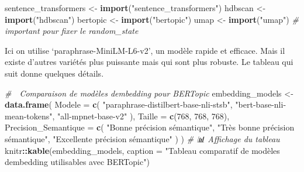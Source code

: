\documentclass[
]{article}
\newenvironment{Shaded}{\begin{snugshade}}{\end{snugshade}}
\newcommand{\AttributeTok}[1]{\textcolor[rgb]{0.13,0.29,0.53}{#1}}
\newcommand{\CommentTok}[1]{\textcolor[rgb]{0.56,0.35,0.01}{\textit{#1}}}
\newcommand{\DecValTok}[1]{\textcolor[rgb]{0.00,0.00,0.81}{#1}}
\newcommand{\FunctionTok}[1]{\textcolor[rgb]{0.13,0.29,0.53}{\textbf{#1}}}
\newcommand{\NormalTok}[1]{#1}
\newcommand{\OtherTok}[1]{\textcolor[rgb]{0.56,0.35,0.01}{#1}}
\newcommand{\SpecialCharTok}[1]{\textcolor[rgb]{0.81,0.36,0.00}{\textbf{#1}}}
\newcommand{\StringTok}[1]{\textcolor[rgb]{0.31,0.60,0.02}{#1}}
\begin{document}
\begin{Shaded}
\begin{Highlighting}[]
\NormalTok{sentence\_transformers }\OtherTok{\textless{}{-}} \FunctionTok{import}\NormalTok{(}\StringTok{"sentence\_transformers"}\NormalTok{)}
\NormalTok{hdbscan }\OtherTok{\textless{}{-}} \FunctionTok{import}\NormalTok{(}\StringTok{"hdbscan"}\NormalTok{)}
\NormalTok{bertopic }\OtherTok{\textless{}{-}} \FunctionTok{import}\NormalTok{(}\StringTok{"bertopic"}\NormalTok{)}
\NormalTok{umap }\OtherTok{\textless{}{-}} \FunctionTok{import}\NormalTok{(}\StringTok{"umap"}\NormalTok{)  }\CommentTok{\# important pour fixer le random\_state}
\end{Highlighting}
\end{Shaded}

\begin{Shaded}
\end{Shaded}

Ici on utilise `paraphrase-MiniLM-L6-v2', un modèle rapide et efficace.
Mais il existe d'autres variétés plus puissante mais qui sont plus
robuste. Le tableau qui suit donne quelques détails.

\begin{Shaded}
\begin{Highlighting}[]
\CommentTok{\# 🧮 Comparaison de modèles d\textquotesingle{}embedding pour BERTopic}
\NormalTok{embedding\_models }\OtherTok{\textless{}{-}} \FunctionTok{data.frame}\NormalTok{(}
  \AttributeTok{Modele =} \FunctionTok{c}\NormalTok{(}
    \StringTok{"paraphrase{-}distilbert{-}base{-}nli{-}stsb"}\NormalTok{,}
    \StringTok{"bert{-}base{-}nli{-}mean{-}tokens"}\NormalTok{,}
    \StringTok{"all{-}mpnet{-}base{-}v2"}
\NormalTok{  ),}
  \AttributeTok{Taille =} \FunctionTok{c}\NormalTok{(}\DecValTok{768}\NormalTok{, }\DecValTok{768}\NormalTok{, }\DecValTok{768}\NormalTok{),}
  \AttributeTok{Precision\_Semantique =} \FunctionTok{c}\NormalTok{(}
    \StringTok{"Bonne précision sémantique"}\NormalTok{,}
    \StringTok{"Très bonne précision sémantique"}\NormalTok{,}
    \StringTok{"Excellente précision sémantique"}
\NormalTok{  )}
\NormalTok{)}
\CommentTok{\# 📊 Affichage du tableau}
\NormalTok{knitr}\SpecialCharTok{::}\FunctionTok{kable}\NormalTok{(embedding\_models, }\AttributeTok{caption =} \StringTok{"Tableau comparatif de modèles d\textquotesingle{}embedding utilisables avec BERTopic"}\NormalTok{)}
\end{Highlighting}
\end{Shaded}
\end{document}
